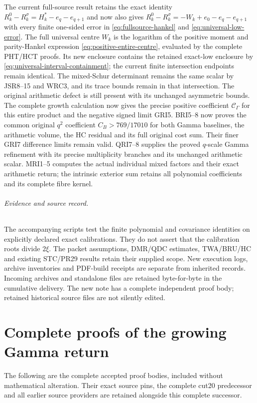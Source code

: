 \documentclass[11pt,a4paper]{article}
\begin{document}
The current full-source result retains the exact identity
$R_k^0-R_k^\sigma=H_k^*-e_q-e_{q+1}$ and now also gives
$R_k^0-R_k^\sigma=-W_k+e_0-e_q-e_{q+1}$ with every finite
one-sided error in \eqref{eq:fullsource-hankel} and
\eqref{eq:universal-low-error}. The full universal centre
$W_k$ is the logarithm of the positive moment and parity-Hankel expression
\eqref{eq:positive-entire-centre}, evaluated by the complete
PHT/HCT proofs. Its new enclosure contains the retained
exact-low enclosure by \eqref{eq:universal-interval-containment};
the current finite intersection endpoints remain identical.
The mixed-Schur determinant remains the same scalar by
JSR8--15 and WRC3, and its trace bounds remain in that intersection.
The original arithmetic defect is still present with its
unchanged asymmetric bounds. The complete growth calculation now
gives the precise positive coefficient $\mathcal C_\Gamma$ for
this entire product and the negative signed limit GRI5.
BRI5--8 now proves the common original $q^2$ coefficient
$C_B>769/17010$ for both Gamma baselines, the arithmetic volume,
the HC residual and its full original cost sum. Their finer
GRI7 difference limits remain valid. QRI7--8 supplies the proved
$q$-scale Gamma refinement with its precise multiplicity branches
and its unchanged arithmetic scalar. MRI1--5 computes the actual
individual mixed factors and their exact arithmetic return; the
intrinsic exterior sum retains all polynomial coefficients and
its complete fibre kernel.

\paragraph{Evidence and source record.}
The accompanying scripts test the finite polynomial and covariance identities on explicitly declared exact calibrations. They do not assert that the calibration roots divide $2\xi$. The packet assumptions, DMR/QDC estimates, TWA/BRU/HC and existing STC/PR29 results retain their supplied scope. New execution logs, archive inventories and PDF-build receipts are separate from inherited records. Incoming archives and standalone files are retained byte-for-byte in the cumulative delivery. The new note has a complete independent proof body; retained historical source files are not silently edited.

\clearpage
\part*{Complete proofs of the growing Gamma return}
The following are the complete accepted proof bodies, included without
mathematical alteration. Their exact source pins, the complete cut20
predecessor and all earlier source providers are retained alongside
this complete successor.


\end{document}
